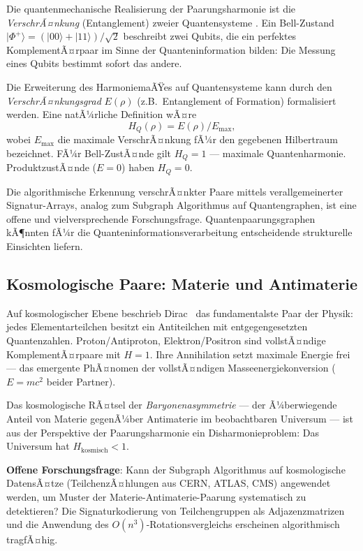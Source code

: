 ﻿\documentclass[a4paper,12pt]{article}
\theoremstyle{definition}
\begin{document}
Die quantenmechanische Realisierung der Paarungsharmonie ist die
\emph{VerschrÃ¤nkung} (Entanglement) zweier Quantensysteme \cite{dirac1930}.
Ein Bell-Zustand $|\Phi^+\rangle = (|00\rangle + |11\rangle)/\sqrt{2}$ beschreibt
zwei Qubits, die ein perfektes KomplementÃ¤rpaar im Sinne der Quanteninformation
bilden: Die Messung eines Qubits bestimmt sofort das andere.

Die Erweiterung des HarmoniemaÃŸes auf Quantensysteme kann durch den
\emph{VerschrÃ¤nkungsgrad} $E(\rho)$ (z.B.\ Entanglement of Formation) formalisiert
werden. Eine natÃ¼rliche Definition wÃ¤re
\[
	H_Q(\rho) = E(\rho) / E_{\max},
\]
wobei $E_{\max}$ die maximale VerschrÃ¤nkung fÃ¼r den gegebenen Hilbertraum bezeichnet.
FÃ¼r Bell-ZustÃ¤nde gilt $H_Q = 1$ --- maximale Quantenharmonie. ProduktzustÃ¤nde
($E = 0$) haben $H_Q = 0$.

Die algorithmische Erkennung verschrÃ¤nkter Paare mittels verallgemeinerter
Signatur-Arrays, analog zum Subgraph Algorithmus auf Quantengraphen, ist eine
offene und vielversprechende Forschungsfrage. Quantenpaarungsgraphen kÃ¶nnten
fÃ¼r die Quanteninformationsverarbeitung entscheidende strukturelle Einsichten
liefern.

\subsection{Kosmologische Paare: Materie und Antimaterie}

Auf kosmologischer Ebene beschrieb Dirac~\cite{dirac1930} das fundamentalste
Paar der Physik: jedes Elementarteilchen besitzt ein Antiteilchen mit entgegengesetzten
Quantenzahlen. Proton/Antiproton, Elektron/Positron sind vollstÃ¤ndige KomplementÃ¤rpaare
mit $H = 1$. Ihre Annihilation setzt maximale Energie frei --- das emergente PhÃ¤nomen
der vollstÃ¤ndigen Masseenergiekonversion ($E = mc^2$ beider Partner).

Das kosmologische RÃ¤tsel der \emph{Baryonenasymmetrie} --- der Ã¼berwiegende Anteil
von Materie gegenÃ¼ber Antimaterie im beobachtbaren Universum --- ist aus der
Perspektive der Paarungsharmonie ein Disharmonieproblem: Das Universum hat
$H_{\mathrm{kosmisch}} < 1$.

\textbf{Offene Forschungsfrage}: Kann der Subgraph Algorithmus auf kosmologische
DatensÃ¤tze (TeilchenzÃ¤hlungen aus CERN, ATLAS, CMS) angewendet werden, um
Muster der Materie-Antimaterie-Paarung systematisch zu detektieren?
Die Signaturkodierung von Teilchengruppen als Adjazenzmatrizen und die
Anwendung des $O(n^3)$-Rotationsvergleichs erscheinen algorithmisch tragfÃ¤hig.
\end{document}
